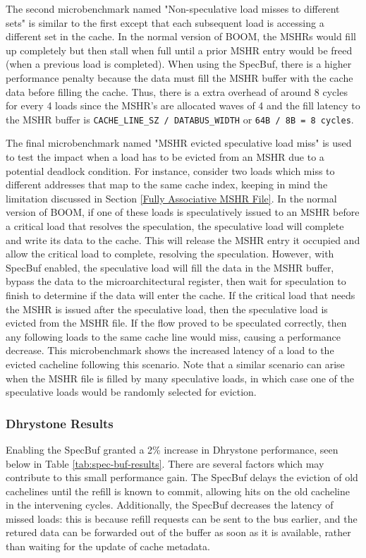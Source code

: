 The second microbenchmark named "Non-speculative load misses to different sets" is similar to the first except that each subsequent
load is accessing a different set in the cache. In the normal version of BOOM, the MSHRs would fill up completely but then stall 
when full until a prior MSHR entry would be freed (when a previous load is completed). When using the SpecBuf, there is a
higher performance penalty because the data must fill the MSHR buffer with the cache data before filling the cache. Thus, there 
is a extra overhead of around 8 cycles for every 4 loads since the MSHR's are allocated waves of 4 and the fill latency to the MSHR
buffer is {\tt CACHE\_LINE\_SZ / DATABUS\_WIDTH} or {\tt 64B / 8B = 8 cycles}.

The final microbenchmark named "MSHR evicted speculative load miss" is used to test the impact when a load has to be evicted from an 
MSHR due to a potential deadlock condition. For instance, consider two loads which miss to different addresses that map to the same cache index, keeping in mind the limitation discussed in Section \ref{Fully Associative MSHR File}. In the normal version of BOOM, if one of these loads is speculatively issued to an 
MSHR before a critical load that resolves the speculation, the speculative load will complete and
write its data to the cache. This will release the MSHR entry it occupied and allow the critical load to complete, resolving the speculation. 
However, with SpecBuf enabled, the speculative load will fill the data in the MSHR buffer, bypass the data to the microarchitectural register, 
then wait for speculation to finish to determine if the data will enter the cache. If the critical load that needs the MSHR is issued after the speculative load,
then the speculative load is evicted from the MSHR file. If the 
flow proved to be speculated correctly, then any following loads to the same cache line would miss, causing a performance decrease.
This microbenchmark shows the increased latency of a load to the evicted cacheline following this scenario.
Note that a similar scenario can arise when the MSHR file is filled by many speculative loads, in which case one of the speculative loads would be randomly selected for eviction.

\subsubsection{Dhrystone Results}
Enabling the SpecBuf granted a 2\% increase in Dhrystone performance, seen below in Table \ref{tab:spec-buf-results}. There are several factors which may contribute to this small performance gain. The SpecBuf delays the eviction of old cachelines until the refill is known to commit, allowing hits on the old cacheline in the intervening cycles. Additionally, the SpecBuf decreases the latency of missed loads: this is because refill requests can be sent to the bus earlier, and the retured data can be forwarded out of the buffer as soon as it is available, rather than waiting for the update of cache metadata.

